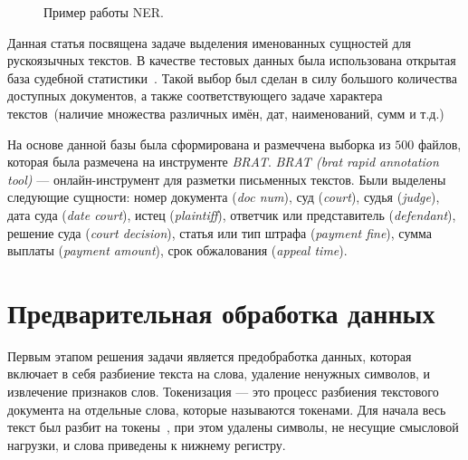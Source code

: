 \documentclass{csmathnotes}
\begin{document}
\begin{figure}[h]
    \caption{Пример работы NER.}
    \label{fig:ner}
\end{figure}


Данная статья посвящена задаче выделения именованных сущностей для рускоязычных текстов.
В качестве тестовых данных была использована открытая база судебной статистики~\cite{CourtsData}.
Такой выбор был сделан в силу большого количества доступных документов, а также соответствующего задаче характера текстов~(наличие множества различных имён, дат, наименований, сумм и т.д.)

На основе данной базы была сформирована и размеччена выборка из $500$ файлов, которая была размечена на инструменте \emph{BRAT}. \emph{BRAT (brat rapid annotation tool)} — онлайн-инструмент для разметки письменных текстов. Были выделены следующие сущности: номер документа (\emph{doc num}), суд (\emph{court}), судья (\emph{judge}), дата суда (\emph{date court}), истец (\emph{plaintiff}), ответчик или представитель (\emph{defendant}), решение суда (\emph{court decision}), статья или тип штрафа (\emph{payment fine}), сумма выплаты (\emph{payment amount}), срок обжалования (\emph{appeal time}).


\section*{Предварительная обработка данных}
Первым этапом решения задачи является предобработка данных, которая включает в себя разбиение текста на слова, удаление ненужных символов, и извлечение признаков слов. 
Токенизация — это процесс разбиения текстового документа на отдельные слова, которые называются токенами.
Для начала весь текст был разбит на токены~\cite{Ner}, при этом удалены символы, не несущие смысловой нагрузки, и слова приведены к нижнему регистру.
\end{document}

